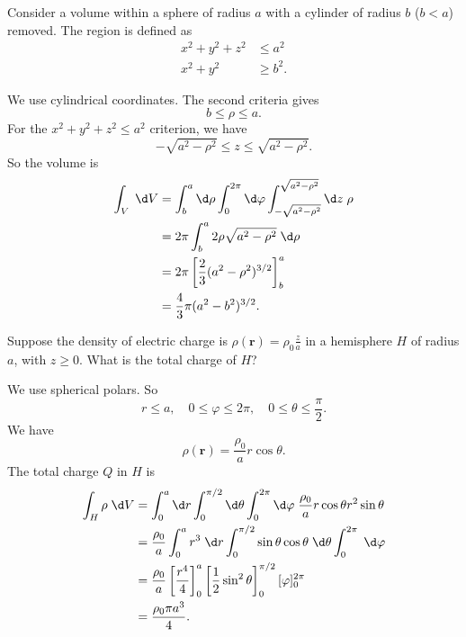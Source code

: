 \documentclass[a4paper]{article}
\begin{document}
\begin{eg}
  Consider a volume within a sphere of radius $a$ with a cylinder of radius $b$ ($b < a$) removed. The region is defined as
  \begin{align*}
    x^2 + y^2 + z^2 &\leq a^2\\
    x^2 + y^2 &\geq b^2.
  \end{align*}
  \begin{center}
  \end{center}
  We use cylindrical coordinates. The second criteria gives
  \[
    b \leq \rho \leq a.
  \]
  For the $x^2 + y^2 + z^2 \leq a^2$ criterion, we have
  \[
    -\sqrt{a^2 - \rho^2} \leq z \leq \sqrt{a^2 - \rho^2}.
  \]
  So the volume is
  \begin{align*}
    \int_V \;\d V &= \int_b^a\d \rho\int_0^{2\pi}\d \varphi \int_{-\sqrt{a^2 - \rho^2}}^{\sqrt{a^2 - \rho^2}}\d z\; \rho\\
    &= 2\pi\int_b^a 2\rho\sqrt{a^2 - \rho^2}\;\d \rho\\
    &= 2\pi \left[\frac{2}{3}(a^2 - \rho^2)^{3/2}\right]^a_b\\
    &= \frac{4}{3}\pi (a^2 - b^2)^{3/2}.
  \end{align*}
\end{eg}
\begin{eg}
  Suppose the density of electric charge is $\rho(\mathbf{r}) = \rho_0 \frac{z}{a}$ in a hemisphere $H$ of radius $a$, with $z \geq 0$. What is the total charge of $H$?

  We use spherical polars. So
  \[
    r \leq a,\quad 0 \leq \varphi \leq 2\pi,\quad 0 \leq \theta \leq \frac{\pi}{2}.
  \]
  We have
  \[
    \rho(\mathbf{r}) = \frac{\rho_0}{a}r\cos \theta.
  \]
  The total charge $Q$ in $H$ is
  \begin{align*}
    \int_H \rho \;\d V &= \int_0^a\d r\int_0^{\pi/2}\d \theta\int_0^{2\pi}\d\varphi\; \frac{\rho_0}{a}r\cos\theta r^2\sin\theta\\
    &= \frac{\rho_0}{a}\int_0^a r^3 \;\d r \int_0^{\pi/2}\sin\theta \cos\theta\;\d \theta \int_0^{2\pi}\;\d \varphi\\
    &= \frac{\rho_0}{a}\left[\frac{r^4}{4}\right]^a_0\left[\frac{1}{2}\sin^2\theta\right]^{\pi/2}_0 [\varphi]^{2\pi}_0\\
    &= \frac{\rho_0 \pi a^3}{4}.
  \end{align*}
\end{eg}
\end{document}
